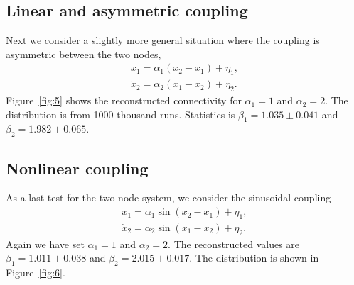 \documentclass[11pt,a4paper]{article}
\begin{document}
\subsection{Linear and asymmetric coupling}
Next we consider a slightly more general situation where the coupling is asymmetric between the two nodes,
\begin{gather}
    \dot{x}_1 = \alpha_1 (x_2-x_1) +\eta_1, \\
    \dot{x}_2 = \alpha_2 (x_1-x_2) +\eta_2.
\end{gather}
Figure~\ref{fig:5} shows the reconstructed connectivity for $\alpha_1=1$ and $\alpha_2=2$. The distribution is from 1000 thousand runs. Statistics is $\beta_1=1.035 \pm 0.041$ and $\beta_2=1.982 \pm 0.065$.

\subsection{Nonlinear coupling}
As a last test for the two-node system, we consider the sinusoidal coupling 
\begin{gather}
    \dot{x}_1 = \alpha_1 \sin(x_2-x_1) +\eta_1, \\
    \dot{x}_2 = \alpha_2 \sin(x_1-x_2) +\eta_2.
\end{gather}
Again we have set $\alpha_1=1$ and $\alpha_2=2$. The reconstructed values are $\beta_1=1.011 \pm 0.038$ and $\beta_2=2.015 \pm 0.017$. The distribution is shown in Figure~\ref{fig:6}.
\end{document}
